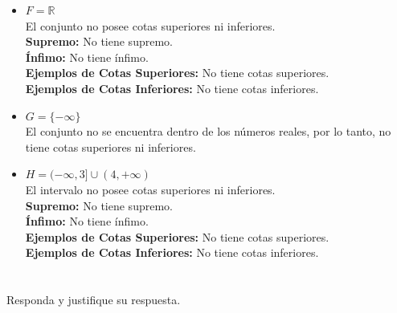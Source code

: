 \documentclass[12pt]{article}
\begin{document}
\begin{itemize}
    \item $F=\mathbb{R} $ \\
    El conjunto no posee cotas superiores ni inferiores. \\
    \textbf{Supremo:} No tiene supremo. \\
    \textbf{Ínfimo:} No tiene ínfimo. \\
    \textbf{Ejemplos de Cotas Superiores:} No tiene cotas superiores. \\
    \textbf{Ejemplos de Cotas Inferiores:} No tiene cotas inferiores. \\

    \item $G=\{-\infty \}$ \\
    El conjunto no se encuentra dentro de los números reales, por lo tanto, no tiene 
    cotas superiores ni inferiores. \\
    
    \item $H=(-\infty , 3] \cup   (4, +\infty ) $ \\
    El intervalo no posee cotas superiores ni inferiores. \\
    \textbf{Supremo:} No tiene supremo. \\
    \textbf{Ínfimo:} No tiene ínfimo. \\
    \textbf{Ejemplos de Cotas Superiores:} No tiene cotas superiores. \\
    \textbf{Ejemplos de Cotas Inferiores:} No tiene cotas inferiores. \\


\end{itemize}
\section{}
Responda y justifique su respuesta.
\end{document}
